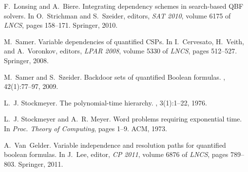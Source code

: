 \documentclass{llncs}
\begin{document}
\begin{thebibliography}{10}
 F.~Lonsing and A.~Biere.  \newblock Integrating
  dependency schemes in search-based {QBF} solvers.  \newblock In O.~Strichman
  and S.~Szeider, editors, {\em SAT 2010}, volume 6175 of {\em LNCS}, pages
  158--171. Springer, 2010.

M.~Samer.
\newblock Variable dependencies of quantified {CSPs}.
\newblock In I.~Cervesato, H.~Veith, and A.~Voronkov, editors, {\em LPAR 2008},
  volume 5330 of {\em LNCS}, pages 512--527. Springer, 2008.

M.~Samer and S.~Szeider.
\newblock Backdoor sets of quantified {B}oolean formulas.
, 42(1):77--97, 2009.

L.~J. Stockmeyer.
\newblock The polynomial-time hierarchy.
, 3(1):1--22, 1976.

L.~J. Stockmeyer and A.~R. Meyer.
\newblock Word problems requiring exponential time.
\newblock In {\em Proc. Theory of Computing}, pages 1--9. ACM, 1973.

 A.~Van~Gelder.  \newblock Variable independence and
  resolution paths for quantified boolean formulas.  \newblock In J.~Lee,
  editor, {\em CP 2011}, volume 6876 of {\em LNCS}, pages 789--803. Springer,
  2011.

\end{thebibliography}
\end{document}
